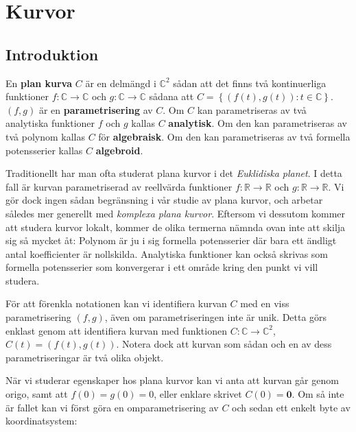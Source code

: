 \chapter{Kurvor}
\label{Curves}

\section{Introduktion}

\begin{Definition}
En \textbf{plan kurva} $C$ är en delmängd i $\mathbb{C}^2$ sådan att det finns två kontinuerliga funktioner $f : \mathbb{C} \rightarrow \mathbb{C}$ och 
$g : \mathbb{C} \rightarrow \mathbb{C}$ sådana att $C = \left\{\left(f(t), g(t)\right) : t \in \mathbb{C}\right\}$. $(f, g)$ är en \textbf{parametrisering} av $C$. Om $C$ kan parametriseras av två analytiska funktioner $f$ och $g$ kallas $C$ \textbf{analytisk}. Om den kan parametriseras av två polynom kallas $C$ för \textbf{algebraisk}. Om den kan parametriseras av två formella potensserier kallas $C$ \textbf{algebroid}.
\end{Definition}

Traditionellt har man ofta studerat plana kurvor i det \emph{Euklidiska planet}. I detta fall är kurvan parametriserad av reellvärda funktioner $f : \mathbb{R} \rightarrow \mathbb{R}$ och 
$g : \mathbb{R} \rightarrow \mathbb{R}$. Vi gör dock ingen sådan begränsning i vår studie av plana kurvor, och arbetar således mer generellt med \emph{komplexa plana kurvor}. Eftersom vi dessutom kommer att studera kurvor lokalt, kommer de olika termerna nämnda ovan inte att skilja sig så mycket åt: Polynom är ju i sig formella potensserier där bara ett ändligt antal koefficienter är nollskilda. Analytiska funktioner kan också skrivas som formella potensserier som konvergerar i ett område kring den punkt vi vill studera.

För att förenkla notationen kan vi identifiera kurvan $C$ med en viss parametrisering $(f, g)$, även om parametriseringen inte är unik. Detta görs enklast genom att identifiera kurvan med funktionen $C : \mathbb{C} \rightarrow \mathbb{C}^2$, $C(t) = \left(f(t), g(t)\right)$. Notera dock att kurvan som sådan och en av dess parametriseringar är två olika objekt.

När vi studerar egenskaper hos plana kurvor kan vi anta att kurvan går
genom origo, samt att $f(0) = g(0) = 0$, eller enklare skrivet $C(0) = \mathbf{0}$. Om så inte är fallet kan vi först göra en omparametrisering av $C$ och sedan ett enkelt byte av koordinatsystem:

